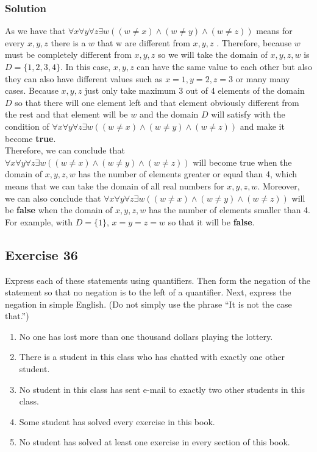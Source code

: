 \documentclass{article}
\begin{document}
\subsubsection*{Solution}
As we have that $\forall x\forall y\forall z\exists w((w\ne x) \land (w \ne y) \land (w \ne z))$ means for every $x, y, z$ there is a $w$ that w are different from $x, y, z$ . Therefore, because $w$ must be completely different from $x, y, z$ so we will take the domain of $x, y, z, w$ is $D = \{1, 2, 3, 4\}$. In this case, $x, y, z$ can have the same value to each other but also they can also have different values such as $x = 1, y = 2, z = 3$ or many many cases. Because $x, y, z$ just only take maximum 3 out of 4 elements of the domain $D$ so that there will one element left and that element obviously different from the rest and that element will be $w$ and the domain $D$ will satisfy with the condition of $\forall x\forall y\forall z\exists w((w\ne x) \land (w \ne y) \land (w \ne z))$ and make it become \textbf{true}. \\

Therefore, we can conclude that $\forall x\forall y\forall z\exists w((w\ne x) \land (w \ne y) \land (w \ne z))$ will become true when the domain of $x, y, z, w$ has the number of elements greater or equal than 4, which means that we can take the domain of all real numbers for $x, y, z, w$. Moreover, we can also conclude that $\forall x\forall y\forall z\exists w((w\ne x) \land (w \ne y) \land (w \ne z))$ will be \textbf{false} when the domain of $x, y, z, w$ has the number of elements smaller than 4. For example, with $D = \{1\}$, $x = y = z = w$ so that it will be \textbf{false}.
\subsection*{Exercise 36}
Express each of these statements using quantifiers. Then form the negation of the statement so that no negation is to the left of a quantifier. Next, express the negation in simple English. (Do not simply use the phrase “It is not the case that.”)
\begin{enumerate} [label = (\alph*)]
    \item No one has lost more than one thousand dollars playing the lottery.
    \item There is a student in this class who has chatted with exactly one other student.
    \item No student in this class has sent e-mail to exactly two other students in this class.
    \item Some student has solved every exercise in this book.
    \item No student has solved at least one exercise in every
          section of this book.
\end{enumerate}
\end{document}
